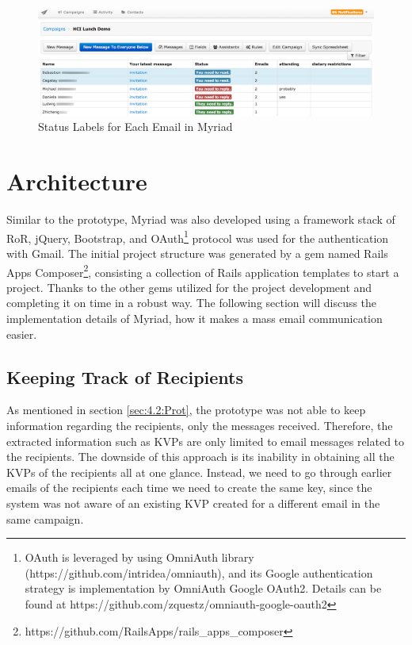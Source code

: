 \clearpage

\begin{figure}[htbp]
	\centering
	\includegraphics[width=1.00\textwidth]{imgs/EmailStatuses.png}
	\caption[Status Labels for Each Email in Myriad]{Status Labels for Each Email in Myriad}
	\label{fig:EmailStatuses}
\end{figure}

\section{Architecture}
\label{sec:5.3:FinaArch}

Similar to the prototype, Myriad was also developed using a framework stack of \ac{RoR}, jQuery, Bootstrap, and OAuth\footnote{OAuth is leveraged by using OmniAuth library (https://github.com/intridea/omniauth), and its Google authentication strategy is implementation by OmniAuth Google OAuth2. Details can be found at https://github.com/zquestz/omniauth-google-oauth2} protocol was used for the authentication with Gmail. The initial project structure was generated by a gem named Rails Apps Composer\footnote{https://github.com/RailsApps/rails\_apps\_composer}, consisting a collection of Rails application templates to start a project. Thanks to the other gems utilized for the project development and completing it on time in a robust way. The following section will discuss the implementation details of Myriad, how it makes a mass email communication easier.

\subsection{Keeping Track of Recipients}
\label{subsec:5.3.1:ReciCont}

As mentioned in section \ref{sec:4.2:Prot}, the prototype was not able to keep information regarding the recipients, only the messages received. Therefore, the extracted information such as \ac{KVP}s are only limited to email messages related to the recipients. The downside of this approach is its inability in obtaining  all the \ac{KVP}s of the recipients all at one glance. Instead, we need to go through earlier emails of the recipients each time we need to create the same key, since the system was not aware of an existing \ac{KVP} created for a different email in the same campaign.
\vspace{1cm}

